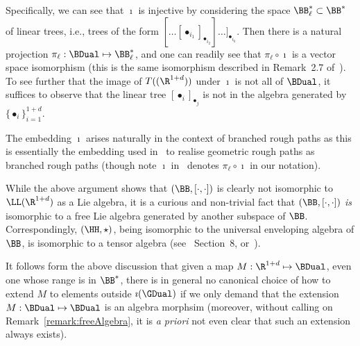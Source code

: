 \documentclass{article}
\begin{document}
Specifically, we can see that $\imath$ is injective by considering the space $\BB^*_\ell \subset \BB^*$ of linear trees, i.e., trees of the form $[\ldots[\bullet_{i_1}]_{\bullet_{i_2}}]\ldots]_{\bullet_{i_k}}$. Then there is a natural projection $\pi_\ell : \BDual \mapsto \BB^*_\ell$, and one can readily see that $\pi_\ell \circ \imath$ is a vector space isomorphism (this is the same isomorphism described in Remark~2.7 of~\cite{HairerKelly15}). To see further that the image of $T((\R^{1+d}))$ under $\imath$ is not all of $\BDual$, it suffices to observe that the linear tree $[\bullet_i]_{\bullet_j}$ is not in the algebra generated by $\{\bullet_i\}_{i=1}^{1+d}$.

\begin{remark}
The embedding $\imath$ arises naturally in the context of branched rough paths as this is essentially the embedding used in~\cite{HairerKelly15} to realise geometric rough paths as branched rough paths (though note $\imath$ in~\cite{HairerKelly15} denotes $\pi_\ell \circ \imath$ in our notation).
\end{remark}


\begin{remark}\label{remark:freeAlgebra}
While the above argument shows that $(\BB, [\cdot,\cdot])$ is clearly not isomorphic to $\LL(\R^{1+d})$ as a Lie algebra, it is a curious and non-trivial fact that $(\BB, [\cdot,\cdot])$ \emph{is} isomorphic to a free Lie algebra generated by another subspace of $\BB$. Correspondingly, $(\HH,\star)$, being isomorphic to the universal enveloping algebra of $\BB$, is isomorphic to a tensor algebra (see~\cite{Foissy02} Section~8, or~\cite{Chapoton10}).
\end{remark}

It follows form the above discussion that given a map $M : \R^{1+d} \mapsto \BDual$, even one whose range is in $\BB^*$, there is in general no canonical choice of how to extend $M$ to elements outside $\imath(\GDual)$ if we only demand that the extension $M : \BDual \mapsto \BDual$ is an algebra morphsim (moreover, without calling on Remark~\ref{remark:freeAlgebra}, it is {\it a priori} not even clear that such an extension always exists).
\end{document}
